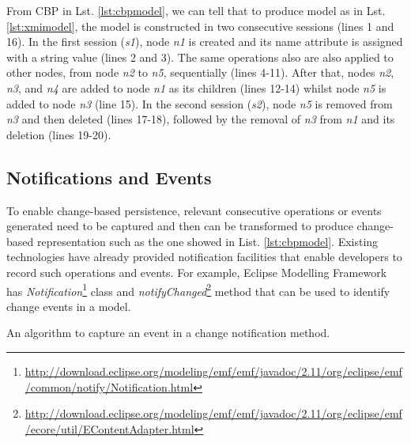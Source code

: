 \documentclass{llncs}
\begin{document}
From CBP in Lst. \ref{lst:cbpmodel}, we can tell that to produce model as in Lst. \ref{lst:xmimodel}, the model is constructed in two consecutive sessions (lines 1 and 16). In the first session (\emph{s1}), node \emph{n1} is created and its name attribute is assigned with a string value (lines 2 and 3). The same operations also are also applied to other nodes, from node \emph{n2} to \emph{n5}, sequentially (lines 4-11). After that, nodes \emph{n2}, \emph{n3}, and \emph{n4} are added to node \emph{n1} as its children (lines 12-14) whilst node \emph{n5} is added to node \emph{n3} (line 15). In the second session (\emph{s2}), node \emph{n5} is removed from \emph{n3} and then deleted (lines 17-18), followed by the removal of \emph{n3} from \emph{n1} and its deletion (lines 19-20).

\subsection{Notifications and Events}
\label{sec:notifications_and_events}
To enable change-based persistence, relevant consecutive operations or events generated need to be captured and then can be transformed to produce change-based representation such as the one showed in List. \ref{lst:cbpmodel}. Existing technologies have already provided notification facilities that enable developers to record such operations and events. For example, Eclipse Modelling Framework has \emph{Notification}\footnote{\url{http://download.eclipse.org/modeling/emf/emf/javadoc/2.11/org/eclipse/emf/common/notify/Notification.html}} class and \emph{notifyChanged}\footnote{\url{http://download.eclipse.org/modeling/emf/emf/javadoc/2.11/org/eclipse/emf/ecore/util/EContentAdapter.html}} method that can be used to identify change events in a model. 

\begin{algorithm}
\begin{small}
\end{small}
\caption{An algorithm to capture an event in a change notification method.}
\label{alg:capture_events}
\end{algorithm}
\end{document}

